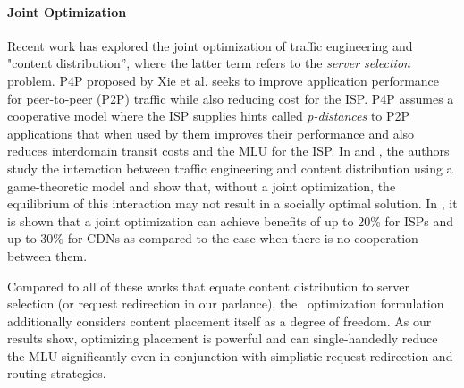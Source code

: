 {\paragraph{Joint Optimization} Recent work has explored the joint optimization of traffic engineering and "content distribution'', where the latter term refers to the {\em server selection} problem.
P4P proposed by Xie et al.  \cite{P4P} seeks to improve application performance for peer-to-peer (P2P) traffic while also reducing cost for the ISP. P4P assumes a cooperative model where the ISP supplies hints called {\em p-distances} to P2P applications that when used by them improves their performance and also reduces interdomain transit costs and the MLU for the ISP. In  \cite{Jiang2009} and  \cite{JohariGameTheory}, the authors study the interaction between traffic engineering and content distribution using a game-theoretic model and show that, without a joint optimization, the equilibrium of this interaction may not result in a socially optimal solution. In  \cite{Jiang2009}, it is shown that a joint optimization can achieve benefits of up to 20\% for ISPs and up to 30\% for CDNs as compared to the case when there is no cooperation between them. 

Compared to all of these works that equate content distribution to server selection (or request redirection in our parlance), the \ncp\ optimization formulation additionally considers content placement itself as a degree of freedom. As our results show, optimizing placement is powerful and can single-handedly reduce the MLU significantly even in conjunction with simplistic request redirection and routing strategies. 


}
